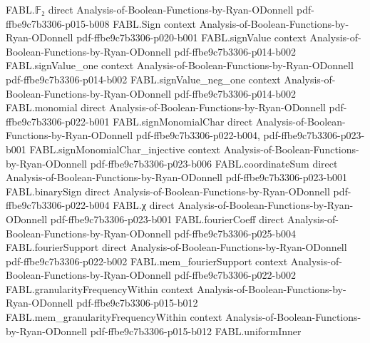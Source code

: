 \begin{theorem}
\leanok
{}
\proofstep
  {FABL.𝔽₂}
  {direct}
  {Analysis-of-Boolean-Functions-by-Ryan-ODonnell}
  {pdf-ffbe9c7b3306-p015-b008}
\proofstep
  {FABL.Sign}
  {context}
  {Analysis-of-Boolean-Functions-by-Ryan-ODonnell}
  {pdf-ffbe9c7b3306-p020-b001}
\proofstep
  {FABL.signValue}
  {context}
  {Analysis-of-Boolean-Functions-by-Ryan-ODonnell}
  {pdf-ffbe9c7b3306-p014-b002}
\proofstep
  {FABL.signValue_one}
  {context}
  {Analysis-of-Boolean-Functions-by-Ryan-ODonnell}
  {pdf-ffbe9c7b3306-p014-b002}
\proofstep
  {FABL.signValue_neg_one}
  {context}
  {Analysis-of-Boolean-Functions-by-Ryan-ODonnell}
  {pdf-ffbe9c7b3306-p014-b002}
\proofstep
  {FABL.monomial}
  {direct}
  {Analysis-of-Boolean-Functions-by-Ryan-ODonnell}
  {pdf-ffbe9c7b3306-p022-b001}
\proofstep
  {FABL.signMonomialChar}
  {direct}
  {Analysis-of-Boolean-Functions-by-Ryan-ODonnell}
  {pdf-ffbe9c7b3306-p022-b004,
    pdf-ffbe9c7b3306-p023-b001}
\proofstep
  {FABL.signMonomialChar_injective}
  {context}
  {Analysis-of-Boolean-Functions-by-Ryan-ODonnell}
  {pdf-ffbe9c7b3306-p023-b006}
\proofstep
  {FABL.coordinateSum}
  {direct}
  {Analysis-of-Boolean-Functions-by-Ryan-ODonnell}
  {pdf-ffbe9c7b3306-p023-b001}
\proofstep
  {FABL.binarySign}
  {direct}
  {Analysis-of-Boolean-Functions-by-Ryan-ODonnell}
  {pdf-ffbe9c7b3306-p022-b004}
\proofstep
  {FABL.χ}
  {direct}
  {Analysis-of-Boolean-Functions-by-Ryan-ODonnell}
  {pdf-ffbe9c7b3306-p023-b001}
\proofstep
  {FABL.fourierCoeff}
  {direct}
  {Analysis-of-Boolean-Functions-by-Ryan-ODonnell}
  {pdf-ffbe9c7b3306-p025-b004}
\proofstep
  {FABL.fourierSupport}
  {direct}
  {Analysis-of-Boolean-Functions-by-Ryan-ODonnell}
  {pdf-ffbe9c7b3306-p022-b002}
\proofstep
  {FABL.mem_fourierSupport}
  {context}
  {Analysis-of-Boolean-Functions-by-Ryan-ODonnell}
  {pdf-ffbe9c7b3306-p022-b002}
\proofstep
  {FABL.granularityFrequencyWithin}
  {context}
  {Analysis-of-Boolean-Functions-by-Ryan-ODonnell}
  {pdf-ffbe9c7b3306-p015-b012}
\proofstep
  {FABL.mem_granularityFrequencyWithin}
  {context}
  {Analysis-of-Boolean-Functions-by-Ryan-ODonnell}
  {pdf-ffbe9c7b3306-p015-b012}
\proofstep
  {FABL.uniformInner}

\end{theorem}
